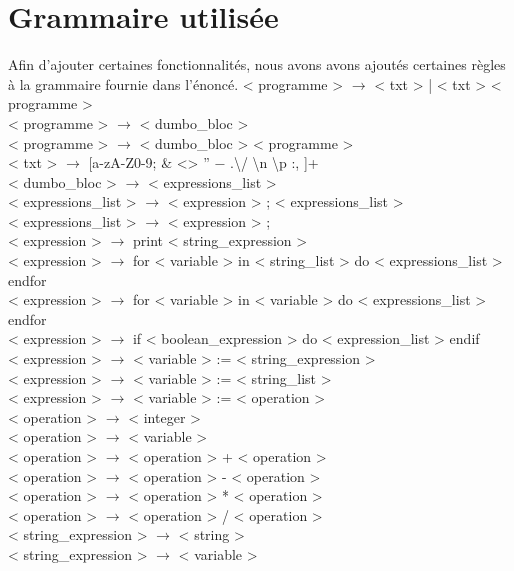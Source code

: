 \documentclass[a4paper,10pt]{article}
\begin{document}
\section{Grammaire utilisée}
Afin d'ajouter certaines fonctionnalités, nous avons avons ajoutés certaines règles à la grammaire fournie dans l'énoncé.\newline
{\small
< programme > $\rightarrow$ < txt > | < txt > < programme >\\
< programme > $\rightarrow$ < dumbo\_bloc > \\
< programme > $\rightarrow$ < dumbo\_bloc > < programme > \\
< txt > $\rightarrow$ [a-zA-Z0-9; \& <> ” − .\textbackslash / \textbackslash n \textbackslash p :, ]+ \\
< dumbo\_bloc > $\rightarrow$ {{ < expressions\_list > }} \\
< expressions\_list > $\rightarrow$ < expression > ; < expressions\_list >\\
< expressions\_list > $\rightarrow$ < expression > ; \\
< expression > $\rightarrow$ print < string\_expression > \\
< expression > $\rightarrow$ for < variable > in < string\_list > do < expressions\_list > endfor \\
< expression > $\rightarrow$ for < variable > in < variable > do < expressions\_list > endfor \\
< expression > $\rightarrow$ if < boolean\_expression > do < expression\_list > endif\\
< expression > $\rightarrow$ < variable > := < string\_expression > \\
< expression > $\rightarrow$ < variable > := < string\_list > \\
< expression > $\rightarrow$ < variable > := < operation > \\
< operation > $\rightarrow$ < integer > \\
< operation > $\rightarrow$ < variable > \\
< operation > $\rightarrow$ < operation > + < operation >\\
< operation > $\rightarrow$ < operation > - < operation >\\
< operation > $\rightarrow$ < operation > * < operation >\\
< operation > $\rightarrow$ < operation > / < operation >\\
< string\_expression > $\rightarrow$ < string > \\
< string\_expression > $\rightarrow$ < variable > \\
}
\end{document}
